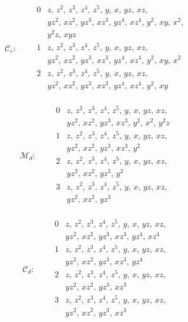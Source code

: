 \documentclass[11pt]{amsart}
\theoremstyle{definition}
\theoremstyle{remark}
\numberwithin{equation}{section}
\begin{document}
\[
\mathcal C_e:\qquad\begin{array}{c|l}
0&z,\,z^{2},\,z^{3},\,z^{4},\,z^{5},\,y,\,x,\,yz,\,xz,\\
&yz^{2},\,xz^{2},\,yz^{3},\,xz^{3},\,yz^{4},\,xz^{4},\,y^{2},\,xy,\,x^{2},\\
&y^{2}z,\,xyz\\
1&z,\,z^{2},\,z^{3},\,z^{4},\,z^{5},\,y,\,x,\,yz,\,xz,\\
&yz^{2},\,xz^{2},\,yz^{3},\,xz^{3},\,yz^{4},\,xz^{4},\,y^{2},\,xy,\,x^{2}\\
2&z,\,z^{2},\,z^{3},\,z^{4},\,z^{5},\,y,\,x,\,yz,\,xz,\\
&yz^{2},\,xz^{2},\,yz^{3},\,xz^{3},\,yz^{4},\,xz^{4},\,y^{2},\,xy\\
\end{array}
\]

\[
\mathcal M_d:\qquad\begin{array}{c|l}
0&z,\,z^{2},\,z^{3},\,z^{4},\,z^{5},\,y,\,x,\,yz,\,xz,\\
&yz^{2},\,xz^{2},\,yz^{3},\,xz^{3},\,y^{2},\,x^{2},\,y^{2}z\\
1&z,\,z^{2},\,z^{3},\,z^{4},\,z^{5},\,y,\,x,\,yz,\,xz,\\
&yz^{2},\,xz^{2},\,yz^{3},\,xz^{3},\,y^{2}\\
2&z,\,z^{2},\,z^{3},\,z^{4},\,z^{5},\,y,\,x,\,yz,\,xz,\\
&yz^{2},\,xz^{2},\,yz^{3},\,y^{2}\\
3&z,\,z^{2},\,z^{3},\,z^{4},\,z^{5},\,y,\,x,\,yz,\,xz,\\
&yz^{2},\,xz^{2},\,yz^{3}\\
\end{array}
\]

\[
\mathcal C_d:\qquad\begin{array}{c|l}
0&z,\,z^{2},\,z^{3},\,z^{4},\,z^{5},\,y,\,x,\,yz,\,xz,\\
&yz^{2},\,xz^{2},\,yz^{3},\,xz^{3},\,yz^{4},\,xz^{4}\\
1&z,\,z^{2},\,z^{3},\,z^{4},\,z^{5},\,y,\,x,\,yz,\,xz,\\
&yz^{2},\,xz^{2},\,yz^{3},\,xz^{3},\,yz^{4}\\
2&z,\,z^{2},\,z^{3},\,z^{4},\,z^{5},\,y,\,x,\,yz,\,xz,\\
&yz^{2},\,xz^{2},\,yz^{3},\,xz^{3}\\
3&z,\,z^{2},\,z^{3},\,z^{4},\,z^{5},\,y,\,x,\,yz,\,xz,\\
&yz^{2},\,xz^{2},\,yz^{3},\,xz^{3}\\
\end{array}
\]
\end{document}
